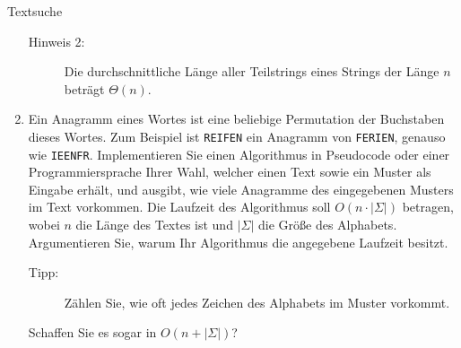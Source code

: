 \documentclass[11pt,a4paper]{article}
\begin{document}
\begin{aufgabe}{3}{Textsuche}
\begin{enumerate}[label=\alph*)]
\begin{description}
            \item[Hinweis 2:] Die durchschnittliche Länge aller Teilstrings eines Strings der Länge $n$ beträgt $\Theta(n)$.
        \end{description}
        \item Ein Anagramm eines Wortes ist eine beliebige Permutation der Buchstaben dieses Wortes.
        Zum Beispiel ist \texttt{REIFEN} ein Anagramm von \texttt{FERIEN}, genauso wie \texttt{IEENFR}.
        Implementieren Sie einen Algorithmus in Pseudocode oder einer Programmiersprache Ihrer Wahl, welcher einen Text sowie ein Muster als Eingabe erhält, und ausgibt, wie viele Anagramme des eingegebenen Musters im Text vorkommen.
        Die Laufzeit des Algorithmus soll $O(n \cdot |\Sigma|)$ betragen, wobei $n$ die Länge des Textes ist und $|\Sigma|$ die Größe des Alphabets.
        Argumentieren Sie, warum Ihr Algorithmus die angegebene Laufzeit besitzt.
        \begin{description}
            \item[Tipp:] Zählen Sie, wie oft jedes Zeichen des Alphabets im Muster vorkommt.
        \end{description}
        Schaffen Sie es sogar in $O(n + |\Sigma|)$?
    \end{enumerate}
    
\end{aufgabe}
\end{document}

